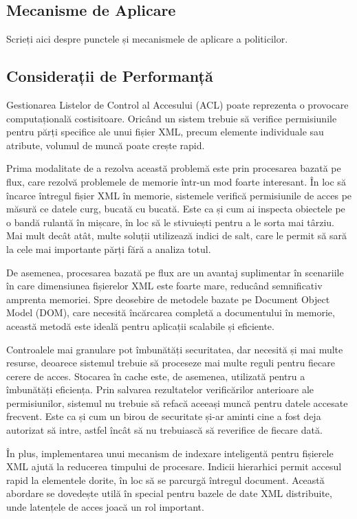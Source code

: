 \documentclass[runningheads]{llncs}
\begin{document}
\begin{spacing}{1.5}
\subsection{Mecanisme de Aplicare}
Scrieți aici despre punctele și mecanismele de aplicare a politicilor.

\subsection{Considerații de Performanță}
Gestionarea Listelor de Control al Accesului (ACL) poate reprezenta o provocare computațională costisitoare. Oricând un sistem trebuie să verifice permisiunile pentru părți specifice ale unui fișier XML, precum elemente individuale sau atribute, volumul de muncă poate crește rapid.

Prima modalitate de a rezolva această problemă este prin procesarea bazată pe flux, care rezolvă problemele de memorie într-un mod foarte interesant. În loc să încarce întregul fișier XML în memorie, sistemele verifică permisiunile de acces pe măsură ce datele curg, bucată cu bucată. Este ca și cum ai inspecta obiectele pe o bandă rulantă în mișcare, în loc să le stivuiești pentru a le sorta mai târziu. Mai mult decât atât, multe soluții utilizează indici de salt, care le permit să sară la cele mai importante părți fără a analiza totul.

De asemenea, procesarea bazată pe flux are un avantaj suplimentar în scenariile în care dimensiunea fișierelor XML este foarte mare, reducând semnificativ amprenta memoriei. Spre deosebire de metodele bazate pe Document Object Model (DOM), care necesită încărcarea completă a documentului în memorie, această metodă este ideală pentru aplicații scalabile și eficiente.

Controalele mai granulare pot îmbunătăți securitatea, dar necesită și mai multe resurse, deoarece sistemul trebuie să proceseze mai multe reguli pentru fiecare cerere de acces. Stocarea în cache este, de asemenea, utilizată pentru a îmbunătăți eficiența. Prin salvarea rezultatelor verificărilor anterioare ale permisiunilor, sistemul nu trebuie să refacă aceeași muncă pentru datele accesate frecvent. Este ca și cum un birou de securitate și-ar aminti cine a fost deja autorizat să intre, astfel încât să nu trebuiască să reverifice de fiecare dată.

În plus, implementarea unui mecanism de indexare inteligentă pentru fișierele XML ajută la reducerea timpului de procesare. Indicii hierarhici permit accesul rapid la elementele dorite, în loc să se parcurgă întregul document. Această abordare se dovedește utilă în special pentru bazele de date XML distribuite, unde latențele de acces joacă un rol important.


\end{spacing}
\end{document}
